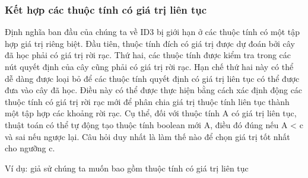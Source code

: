 \subsubsection{Kết hợp các thuộc tính có giá trị liên tục}

Định nghĩa ban đầu của chúng ta về ID3 bị giới hạn ở các thuộc tính có một tập hợp giá trị riêng biệt. Đầu tiên, thuộc tính đích có giá trị được dự đoán bởi cây đã học phải có giá trị rời rạc. Thứ hai, các thuộc tính được kiểm tra trong các nút quyết định của cây cũng phải có giá trị rời rạc. Hạn chế thứ hai này có thể dễ dàng được loại bỏ để các thuộc tính quyết định có giá trị liên tục có thể được đưa vào cây đã học. Điều này có thể được thực hiện bằng cách xác định động các thuộc tính có giá trị rời rạc mới để phân chia giá trị thuộc tính liên tục thành một tập hợp các khoảng rời rạc. Cụ thể, đối với thuộc tính A có giá trị liên tục, thuật toán có thể tự động tạo thuộc tính boolean mới A, điều đó đúng nếu A < c và sai nếu ngược lại. Câu hỏi duy nhất là làm thế nào để chọn giá trị tốt nhất cho ngưỡng c.

Ví dụ: giả sử chúng ta muốn bao gồm thuộc tính có giá trị liên tục

